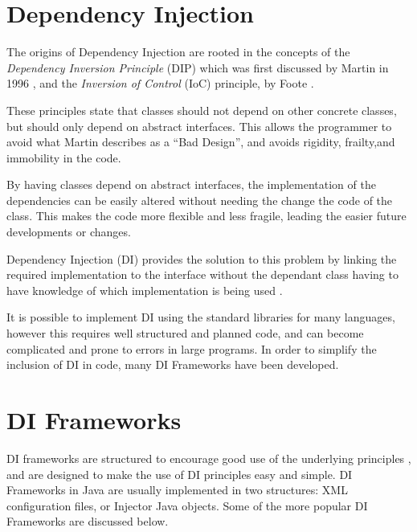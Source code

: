 \documentclass[12pt,twocolumn]{IEEEtran}
\begin{document}
\section{Dependency Injection}\label{sec:di}

The origins of Dependency Injection are rooted in the concepts of the \textit{Dependency Inversion Principle} (DIP) which was first discussed by Martin in 1996 \cite{martin1996}, and the \textit{Inversion of Control} (IoC) principle, by Foote \cite{foote1988}. 



These principles state that classes should not depend on other concrete classes, but should only depend on abstract interfaces. This allows the programmer to avoid what Martin describes as a ``Bad Design'', and avoids rigidity, frailty,and immobility in the code.

By having classes depend on abstract interfaces, the implementation of the dependencies can be easily altered without needing the change the code of the class. This makes the code more flexible and less fragile, leading the easier future developments or changes. 

Dependency Injection (DI) provides the solution to this problem by linking the required implementation to the interface without the dependant class having to have knowledge of which implementation is being used \cite{tonymarston2016,hongyulyangewantemperohaydenmelton2008}. 

It is possible to implement DI using the standard libraries for many languages, however this requires well structured and planned code, and can become complicated and prone to errors in large programs. In order to simplify the inclusion of DI in code, many DI Frameworks have been developed.

\section{DI Frameworks}\label{sec:dif}

DI frameworks are structured to encourage good use of the underlying principles \cite{rodjohnson2005,dennisdoomen2018}, and are designed to make the use of DI principles easy and simple. DI Frameworks in Java are usually implemented in two structures: XML configuration files, or Injector Java objects. Some of the more popular DI Frameworks are discussed below.
\end{document}
